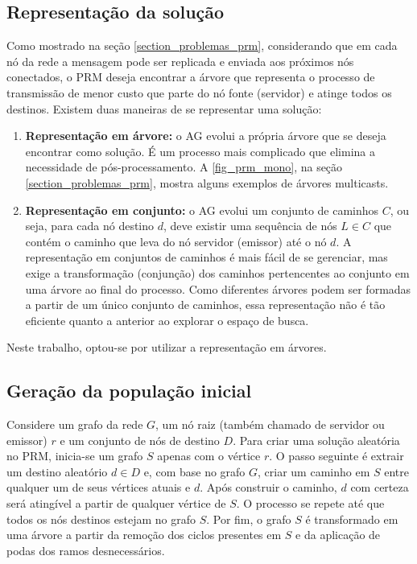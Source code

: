 \subsection{Representação da solução}

Como mostrado na seção \ref{section_problemas_prm}, considerando que em cada nó da rede a mensagem pode ser replicada e enviada aos próximos nós conectados, o PRM deseja encontrar a árvore que representa o processo de transmissão de menor custo que parte do nó fonte (servidor) e atinge todos os destinos. Existem duas maneiras de se representar uma solução:

\begin{enumerate}
	\item \textbf{Representação em árvore:} \cite{Bueno2010} o AG evolui a própria árvore que se deseja encontrar como solução. É um processo mais complicado que elimina a necessidade de pós-processamento. A \autoref{fig_prm_mono}, na seção \ref{section_problemas_prm}, mostra alguns exemplos de árvores multicasts.
	\item \textbf{Representação em conjunto:} \cite{Baran2004} o AG evolui um conjunto de caminhos $C$, ou seja, para cada nó destino $d$, deve existir uma sequência de nós $L \in C$ que contém o caminho que leva do nó servidor (emissor) até o nó $d$. A representação em conjuntos de caminhos é mais fácil de se gerenciar, mas exige a transformação (conjunção) dos caminhos pertencentes ao conjunto em uma árvore  ao final do processo. Como diferentes árvores podem ser formadas a partir de um único conjunto de caminhos, essa representação não é tão eficiente quanto a anterior ao explorar o espaço de busca.
\end{enumerate}

Neste trabalho, optou-se por utilizar a representação em árvores.

\subsection{Geração da população inicial}

Considere um grafo da rede $G$, um nó raiz (também chamado de servidor ou emissor) $r$ e um conjunto de nós de destino $D$. Para criar uma solução aleatória no PRM, inicia-se um grafo $S$ apenas com o vértice $r$. O passo seguinte é extrair um destino aleatório $d \in D$ e, com base no grafo $G$, criar um caminho em $S$ entre qualquer um de seus vértices atuais e $d$. Após construir o caminho, $d$ com certeza será atingível a partir de qualquer vértice de $S$. O processo se repete até que todos os nós destinos estejam no grafo $S$. Por fim, o grafo $S$ é transformado em uma árvore a partir da remoção dos ciclos presentes em $S$ e da aplicação de podas dos ramos desnecessários.

